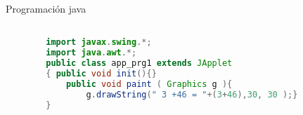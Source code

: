 \documentclass{beamer}
\begin{document}
\begin{frame}[fragile]{Programaci\'on java} %
   \begin{lstlisting}[language=Java]

        import javax.swing.*;
        import java.awt.*;
        public class app_prg1 extends JApplet
        { public void init(){}
            public void paint ( Graphics g ){
                g.drawString(" 3 +46 = "+(3+46),30, 30 );}
        }
    \end{lstlisting}   
\end{frame}
\end{document}
